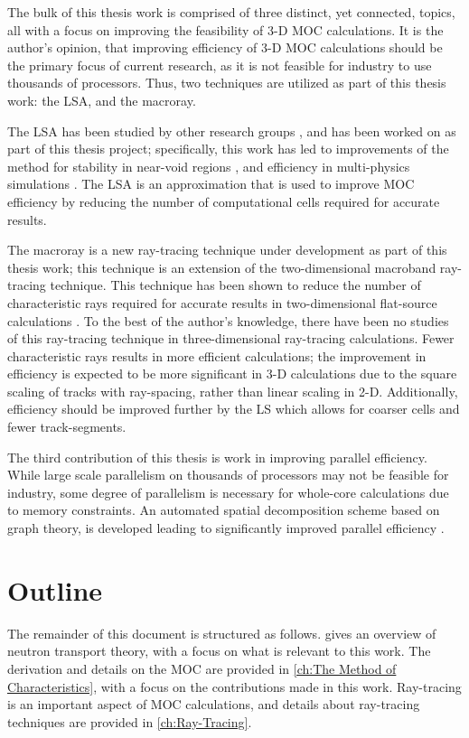 {{        The bulk of this thesis work is comprised of three distinct, yet connected, topics, all with a focus on improving the feasibility of 3-D \ac{MOC} calculations.
        It is the author's opinion, that improving efficiency of 3-D \ac{MOC} calculations should be the primary focus of current research, as it is not feasible for industry to use thousands of processors.
        Thus, two techniques are utilized as part of this thesis work: the \acf{LSA}, and the macroray.

        The \ac{LSA} has been studied by other research groups \cite{Ferrer2016,Ferrer2018,Gunow2018}, and has been worked on as part of this thesis project; specifically, this work has led to improvements of the method for stability in near-void regions \cite{Fitzgerald2018}, and efficiency in multi-physics simulations \cite{Fitzgerald2019}.
        The \ac{LSA} is an approximation that is used to improve \ac{MOC} efficiency by reducing the number of computational cells required for accurate results.

        The macroray is a new ray-tracing technique under development as part of this thesis work; this technique is an extension of the two-dimensional macroband \cite{Villarino1992} ray-tracing technique.
        This technique has been shown to reduce the number of characteristic rays required for accurate results in two-dimensional flat-source calculations \cite{Yamamoto2005,Fevotte2007}.
        To the best of the author's knowledge, there have been no studies of this ray-tracing technique in three-dimensional ray-tracing calculations.
        Fewer characteristic rays results in more efficient calculations; the improvement in efficiency is expected to be more significant in 3-D calculations due to the square scaling of tracks with ray-spacing, rather than linear scaling in 2-D.
        Additionally, efficiency should be improved further by the \ac{LS} which allows for coarser cells and fewer track-segments.

        The third contribution of this thesis is work in improving parallel efficiency.
        While large scale parallelism on thousands of processors may not be feasible for industry, some degree of parallelism is necessary for whole-core calculations due to memory constraints.
        An automated spatial decomposition scheme based on graph theory, is developed leading to significantly improved parallel efficiency \cite{Fitzgerald2017,Fitzgerald2019a}.
    }
    \section{Outline}{\label{sec:Introduction:Outline}
        The remainder of this document is structured as follows.
         gives an overview of neutron transport theory, with a focus on what is relevant to this work.
        The derivation and details on the \acf{MOC} are provided in \cref{ch:The Method of Characteristics}, with a focus on the contributions made in this work.
        Ray-tracing is an important aspect of \acf{MOC} calculations, and details about ray-tracing techniques are provided in \cref{ch:Ray-Tracing}.
    }

    \printbibliography
}
